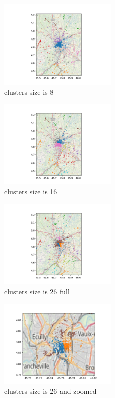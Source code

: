 \documentclass{article}
\begin{document}
\begin{figure}[!h]
  \centering
  \includegraphics[width=0.5\textwidth]{small_clusters_8.png}
  \caption{clusters size is 8}
  \label{fig:clusters_8}
\end{figure}


\begin{figure}[!h]
  \centering
  \includegraphics[width=0.5\textwidth]{medium_clusters_16.png}
  \caption{clusters size is 16}
	\label{fig:clusters_16}
\end{figure}

\begin{figure}[!h]
  \centering
  \includegraphics[width=0.5\textwidth]{clustering_26_full.png}
  \caption{clusters size is 26 full}
	\label{fig:clusters_26_full}
\end{figure}

\begin{figure}[!h]
  \centering
  \includegraphics[width=0.5\textwidth]{clustering_26_zoomed.png}
  \caption{clusters size is 26 and zoomed}
	\label{fig:clusters_26_zoomed}
\end{figure}
\end{document}
